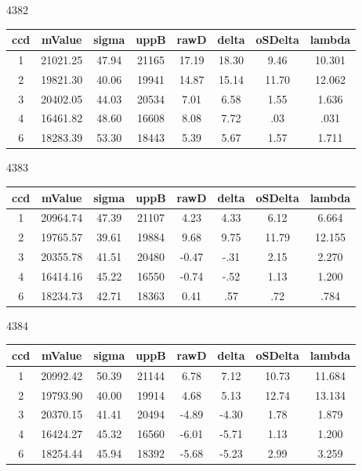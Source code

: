 \documentclass[11pt]{book}
\begin{document}
4382
\begin{table}[!h]
\centering
\begin{tabular}{|c |c |c |c |c |c |c |c |}
\hline ccd & mValue & sigma & uppB & rawD & delta & oSDelta & lambda \\
\hline 1 & 21021.25 & 47.94 & 21165 & 17.19 & 18.30 & 9.46 & 10.301 \\
\hline 2 & 19821.30 & 40.06 & 19941 & 14.87 & 15.14 & 11.70 & 12.062 \\
\hline 3 & 20402.05 & 44.03 & 20534 & 7.01 & 6.58 & 1.55 & 1.636 \\
\hline 4 & 16461.82 & 48.60 & 16608 & 8.08 & 7.72 & .03 & .031 \\
\hline 6 & 18283.39 & 53.30 & 18443 & 5.39 & 5.67 & 1.57 & 1.711 \\
\hline

\end{tabular}
\end{table}

4383
\begin{table}[!h]
\centering
\begin{tabular}{|c |c |c |c |c |c |c |c |}
\hline ccd & mValue & sigma & uppB & rawD & delta & oSDelta & lambda \\
\hline 1 & 20964.74 & 47.39 & 21107 & 4.23 & 4.33 & 6.12 & 6.664 \\
\hline 2 & 19765.57 & 39.61 & 19884 & 9.68 & 9.75 & 11.79 & 12.155 \\
\hline 3 & 20355.78 & 41.51 & 20480 & -0.47 & -.31 & 2.15 & 2.270 \\
\hline 4 & 16414.16 & 45.22 & 16550 & -0.74 & -.52 & 1.13 & 1.200 \\
\hline 6 & 18234.73 & 42.71 & 18363 & 0.41 & .57 & .72 & .784 \\
\hline

\end{tabular}
\end{table}

4384
\begin{table}[!h]
\centering
\begin{tabular}{|c |c |c |c |c |c |c |c |}
\hline ccd & mValue & sigma & uppB & rawD & delta & oSDelta & lambda \\
\hline 1 & 20992.42 & 50.39 & 21144 & 6.78 & 7.12 & 10.73 & 11.684 \\
\hline 2 & 19793.90 & 40.00 & 19914 & 4.68 & 5.13 & 12.74 & 13.134 \\
\hline 3 & 20370.15 & 41.41 & 20494 & -4.89 & -4.30 & 1.78 & 1.879 \\
\hline 4 & 16424.27 & 45.32 & 16560 & -6.01 & -5.71 & 1.13 & 1.200 \\
\hline 6 & 18254.44 & 45.94 & 18392 & -5.68 & -5.23 & 2.99 & 3.259 \\
\hline

\end{tabular}
\end{table}
\end{document}
